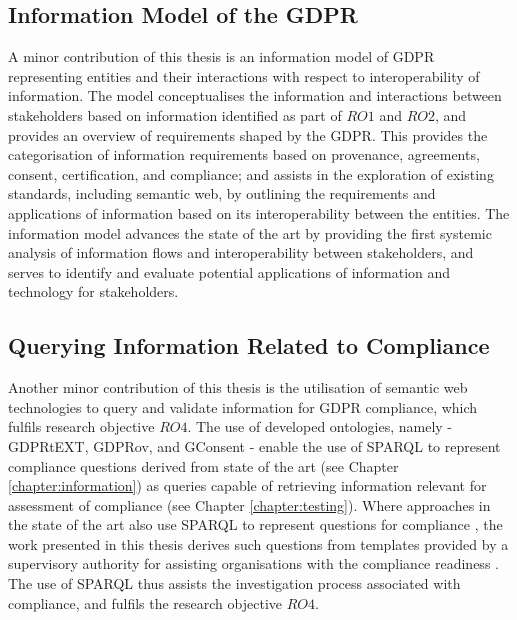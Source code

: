 \subsection{Information Model of the GDPR}
A minor contribution of this thesis is an information model of GDPR representing entities and their interactions with respect to interoperability of information.
The model conceptualises the information and interactions between stakeholders based on information identified as part of $RO1$ and $RO2$, and provides an overview of requirements shaped by the GDPR.
This provides the categorisation of information requirements based on provenance, agreements, consent, certification, and compliance; and assists in the exploration of existing standards, including semantic web, by outlining the requirements and applications of information based on its interoperability between the entities.
The information model advances the state of the art by providing the first systemic analysis of information flows and interoperability between stakeholders, and serves to identify and evaluate potential applications of information and technology for stakeholders.

\subsection{Querying Information Related to Compliance}\label{sec:contributions:querying}
Another minor contribution of this thesis is the utilisation of semantic web technologies to query and validate information for GDPR compliance, which fulfils research objective $RO4$.
The use of developed ontologies, namely - GDPRtEXT, GDPRov, and GConsent - enable the use of SPARQL to represent compliance questions derived from state of the art (see Chapter \ref{chapter:information}) as queries capable of retrieving information relevant for assessment of compliance (see Chapter \ref{chapter:testing}).
Where approaches in the state of the art also use SPARQL to represent questions for compliance \cite{agarwal_legislative_2018,palmirani_pronto:_2018}, the work presented in this thesis derives such questions from templates provided by a supervisory authority for assisting organisations with the compliance readiness \cite{noauthor_gdpr_2017}.
The use of SPARQL thus assists the investigation process associated with compliance, and fulfils the research objective $RO4$.


